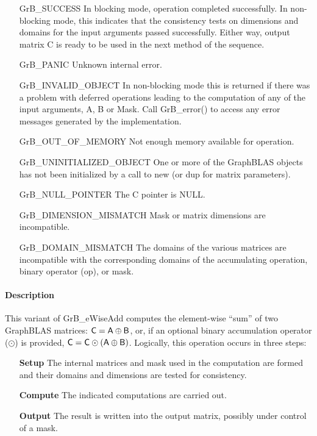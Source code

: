 \begin{itemize}[leftmargin=2.1in]
    \item[{\sf GrB\_SUCCESS}]         In blocking mode, operation
	completed successfully. In non-blocking mode, this indicates
	that the consistency tests on dimensions and domains for the
	input arguments passed successfully. Either way, output matrix
	{\sf C} is ready to be used in the next method of the sequence.

    \item[{\sf GrB\_PANIC}]           Unknown internal error.
    
    \item[{\sf GrB\_INVALID\_OBJECT}] In non-blocking mode this is returned if
    there was a problem with deferred operations leading to the computation of
    any of the input arguments, {\sf A}, {\sf B} or {\sf Mask}.  Call 
    {GrB\_error()} to access any error messages generated by the implementation.

    \item[{\sf GrB\_OUT\_OF\_MEMORY}]        Not enough memory available for operation.
    
    \item[{\sf GrB\_UNINITIALIZED\_OBJECT}] One or more of the GraphBLAS objects 
    has not been initialized by a call to {\sf new} (or {\sf dup} for matrix
    parameters).
    
    \item[{\sf GrB\_NULL\_POINTER}]  The {\sf C} pointer is {\sf NULL}.

    \item[{\sf GrB\_DIMENSION\_MISMATCH}] Mask or matrix dimensions are incompatible.

	\item[{\sf GrB\_DOMAIN\_MISMATCH}]    The domains of the various
	matrices are incompatible with the corresponding domains of the
	accumulating operation, binary operator ({\sf op}), or mask.
\end{itemize}

\paragraph{Description}

This variant of {\sf GrB\_eWiseAdd } computes the element-wise ``sum'' of
two GraphBLAS matrices: ${\sf C} = {\sf A} \oplus {\sf B}$, or, if an optional
binary accumulation operator ($\odot$) is provided, ${\sf C} = {\sf C} \odot
\left({\sf A} \oplus {\sf B}\right)$.  Logically, this operation occurs in
three steps:
\begin{enumerate}[leftmargin=0.75in]
\item[\bf Setup] The internal matrices and mask used in the computation are formed 
and their domains and dimensions are tested for consistency.
\item[\bf Compute] The indicated computations are carried out.
\item[\bf Output] The result is written into the output matrix, possibly under 
control of a mask.
\end{enumerate}

